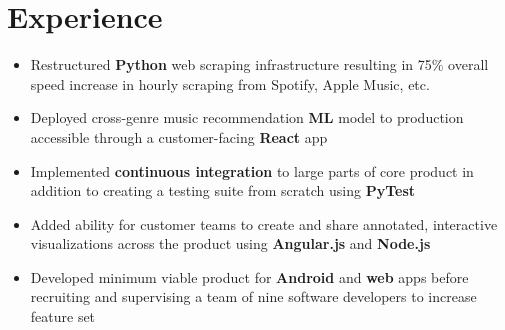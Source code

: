 \documentclass[]{deedy-template}
\begin{document}
\begin{minipage}[t]{0.66\textwidth}


\section{Experience}
	\begin{itemize}[noitemsep,topsep=0pt]
	\itemsep0em 

    \item Restructured \textbf{Python} web scraping infrastructure resulting in 75\% overall 
        \\speed increase in hourly scraping from Spotify, Apple Music, etc. 

    \item Deployed cross-genre music recommendation \textbf{ML} model to production
        \\accessible through a customer-facing \textbf{React} app

    \item Implemented \textbf{continuous integration} to large parts of core product
        in \\addition to creating a testing suite from scratch using \textbf{PyTest}

    \item Added ability for customer teams to create and share annotated, interactive
        visualizations across the product using \textbf{Angular.js} and \textbf{Node.js}

	\end{itemize}

	\sectionsep

	\begin{itemize}[noitemsep,topsep=0pt]
	\itemsep0em 

	\item Developed minimum viable product for \textbf{Android} and \textbf{web} apps before
        \\recruiting and supervising a team of nine software developers to increase
            \\feature set


\end{itemize}
\end{minipage}
\end{document}
